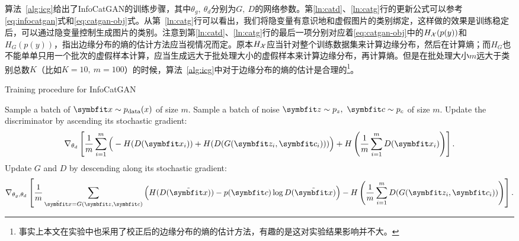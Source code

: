 算法~\ref{alg:icg}给出了InfoCatGAN的训练步骤，其中$\theta_g,~\theta_d$分别为$G, ~D$的网络参数。第\ref{ln:catd}、\ref{ln:catg}行的更新公式可以参考\eqref{eq:infocatgan}式和\eqref{eq:catgan-obj}式。从第~\ref{ln:catg}行可以看出，我们将隐变量有意识地和虚假图片的类别绑定，这样做的效果是训练稳定后，可以通过隐变量控制生成图片的类别。注意到第\ref{ln:catd}、\ref{ln:catg}行的最后一项分别对应着\eqref{eq:catgan-obj}中的$H_{\mathcal{X}}(p(y))$和$H_{G}(p(y))$，\citet{springenberg2015unsupervised}指出边缘分布的熵的估计方法应当视情况而定。原本$H_{\mathcal{X}}$应当针对整个训练数据集来计算边缘分布，然后在计算熵；而$H_G$也不能单单只用一个批次的虚假样本计算，应当生成远大于批处理大小的虚假样本来计算边缘分布，再计算熵。但是在批处理大小$m$远大于类别总数$K$（比如$K=10, ~m=100$）的时候，算法~\ref{alg:icg}中对于边缘分布的熵的估计是合理的\footnote{事实上本文在实验中也采用了校正后的边缘分布的熵的估计方法，有趣的是这对实验结果影响并不大。}。
\begin{algorithm}[htbp]
  \small
  \caption{Training procedure for InfoCatGAN}
  \label{alg:icg}
  \begin{algorithmic}[1]
      \State Sample a batch of $\bd{x} \sim p_{\text{data}}(x)$ of size $m$.
      \State Sample a batch of noise $\bd{z}\sim p_z, ~\bd{c}\sim p_c$ of size
      $m$.
      \State Update the discriminator by ascending its stochastic gradient:
      \label{ln:catd}
      \[
        \nabla_{\theta_d} \left[ 
          \frac{1}{m} \sum_{i=1}^m \Big( 
            - H(D(\bd{x}_i)) + H(D(G(\bd{z}_i, \bd{c}_i)))
          \Big) + H\left( \frac{1}{m}\sum_{i=1}^m D(\bd{x}_i) \right)
        \right].
      \]
      \State Update $G$ and $D$ by descending along its stochastic gradient:
      \label{ln:catg}
      \[
        \nabla_{\theta_g,\theta_d} \left[ 
          \frac{1}{m} \sum_{\tilde{\bd{x}} = G(\bd{z},\bd{c})} \Big(
            H(D(\tilde{\bd{x}})) - p(\bd{c})\log D(\tilde{\bd{x}})
          \Big)
          - H \left( 
            \frac{1}{m}\sum_{i=1}^m D(G(\bd{z}_i, \bd{c}_i))
          \right)
        \right].
      \]
    \EndFor
  \end{algorithmic}
\end{algorithm}


